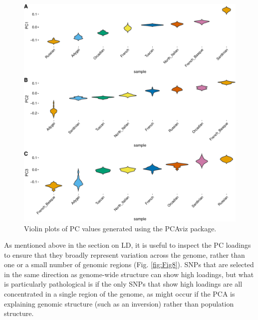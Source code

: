 \documentclass{svmult}       %
\begin{document}
\begin{figure}
\includegraphics[width=1\linewidth]{Figures/Figure7}
\caption{\label{fig:Fig7}
    Violin plots of PC values generated using the PCAviz package.}
\end{figure}

As mentioned above in the section on LD, it is useful to inspect the PC
loadings to ensure that they broadly represent variation across the
genome, rather than one or a small number of genomic regions
\cite{Duforet-Frebourg16} (Fig. \ref{fig:Fig8}). SNPs that are selected in the same
direction as genome-wide structure can show high loadings, but what is
particularly pathological is if the only SNPs that show high loadings
are all concentrated in a single region of the genome, as might occur if
the PCA is explaining genomic structure (such as an inversion) rather
than population structure.
\end{document}
